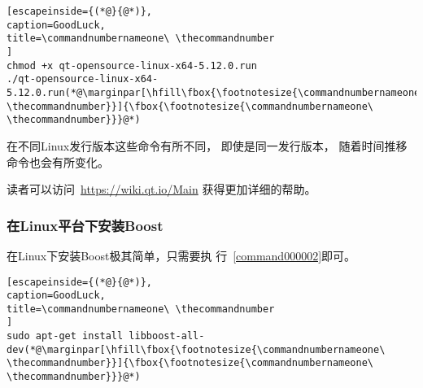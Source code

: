 {}\label{command000001}    %
\begin{lstlisting}[escapeinside={(*@}{@*)},
caption=GoodLuck,
title=\commandnumbernameone\ \thecommandnumber
]
chmod +x qt-opensource-linux-x64-5.12.0.run
./qt-opensource-linux-x64-5.12.0.run(*@\marginpar[\hfill\fbox{\footnotesize{\commandnumbernameone\ \thecommandnumber}}]{\fbox{\footnotesize{\commandnumbernameone\ \thecommandnumber}}}@*)\end{lstlisting}          %
\addtocounter{lstlisting}{-1}   %


在不同Linux发行版本这些命令有所不同，
即使是同一发行版本，
随着时间推移命令也会有所变化。

读者可以访问\ \url{https://wiki.qt.io/Main}
获得更加详细的帮助。




\FloatBarrier
\subsubsection{
在Linux平台下安装Boost
}\label{ss000510}



在Linux下安装Boost极其简单，只需要执
行\commandnumbernameone\ \ref{command000002}即可。

{}\label{command000002}    %
\begin{lstlisting}[escapeinside={(*@}{@*)},
caption=GoodLuck,
title=\commandnumbernameone\ \thecommandnumber
]
sudo apt-get install libboost-all-dev(*@\marginpar[\hfill\fbox{\footnotesize{\commandnumbernameone\ \thecommandnumber}}]{\fbox{\footnotesize{\commandnumbernameone\ \thecommandnumber}}}@*)\end{lstlisting}          %
\addtocounter{lstlisting}{-1}   %
















